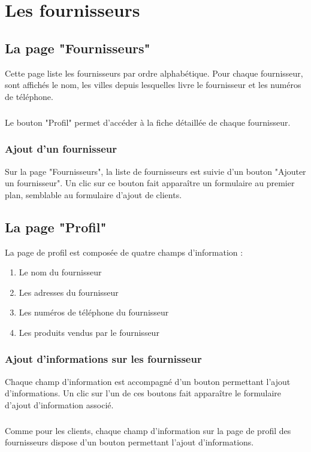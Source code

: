 \chapter{Les fournisseurs}

\section{La page "Fournisseurs"}
Cette page liste les fournisseurs par ordre alphabétique. Pour chaque fournisseur, sont
affichés le nom, les villes depuis lesquelles livre le fournisseur et
les numéros de téléphone.

\paragraph{}
Le bouton "Profil" permet d'accéder à la fiche détaillée de chaque fournisseur.

\subsection{Ajout d'un fournisseur}
Sur la page "Fournisseurs", la liste de fournisseurs est suivie d'un bouton
"Ajouter un fournisseur". Un clic sur ce bouton fait apparaître un formulaire au
premier plan, semblable au formulaire d'ajout de clients.

\section{La page "Profil"}
La page de profil est composée de quatre champs d'information :

\begin{enumerate}
  \item Le nom du fournisseur
  \item Les adresses du fournisseur
  \item Les numéros de téléphone du fournisseur
  \item Les produits vendus par le fournisseur
\end{enumerate}

\subsection{Ajout d'informations sur les fournisseur}
Chaque champ d'information est accompagné d'un bouton permettant l'ajout d'informations.
Un clic sur l'un de ces boutons fait apparaître le formulaire d'ajout
d'information associé.

\paragraph{}
Comme pour les clients, chaque champ d'information sur la page de profil
des fournisseurs dispose
d'un bouton permettant l'ajout d'informations.

